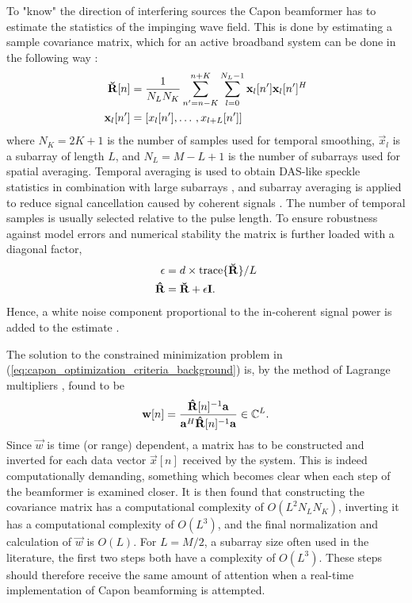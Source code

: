 To "know" the direction of interfering sources the Capon beamformer has to estimate the statistics of the impinging wave field. This is done by estimating a sample covariance matrix, which for an active broadband system can be done in the following way \cite{Synnevag2009}:
\begin{align}
\mathbf{\breve{R}}[n] &= \frac{1}{N_LN_K}\sum_{n'=n-K}^{n+K} \sum_{l=0}^{N_L-1} \mathbf{x}_l[n']\mathbf{x}_l[n']^H\\
\mathbf{x}_l[n'] &= [x_l[n'], \dotso, x_{l+L}[n']]
\end{align}
where $N_K = 2K + 1$  is the number of samples used for temporal smoothing, $\vec{x}_l$ is a subarray of length $L$, and $N_L = M-L+1$ is the number of subarrays used for spatial averaging.  Temporal averaging is used to obtain DAS-like speckle statistics in combination with large subarrays \cite{Synnevag2007a}, and subarray averaging is applied to reduce signal cancellation caused by coherent signals \cite{Reddy1987}. The number of temporal samples is usually selected relative to the pulse length. To ensure robustness against model errors and numerical stability the matrix is further loaded with a diagonal factor, 
\begin{align}
\epsilon &= d\times\text{trace}\{\mathbf{\breve{R}}\}/L\\
\mathbf{\hat{R}} &= \mathbf{\breve{R}} + \epsilon\mathbf{I}.
\end{align} 
Hence, a white noise component proportional to the in-coherent signal power is added to the estimate \cite{Featherstone1997b}.

The solution to the constrained minimization problem in (\ref{eq:capon_optimization_criteria_background}) is, by the method of Lagrange multipliers \cite{VanTrees2003}, found to be
\begin{align}\label{eq:capon_weights}
\mathbf{w}[n] = \frac{\mathbf{\hat{R}}[n]^{-1}\mathbf{a}}{\mathbf{a}^H\mathbf{\hat{R}}[n]^{-1}\mathbf{a}} \in \mathbb{C}^L.
\end{align}
Since $\vec{w}$ is time (or range) dependent, a matrix has to be constructed and inverted for each data vector $\vec{x}[n]$ received by the system. This is indeed computationally demanding, something which becomes clear when each step of the beamformer is examined closer. It is then found that constructing the covariance matrix has a computational complexity of $O(L^2N_LN_K)$, inverting it has a computational complexity of $O(L^3)$, and the final normalization and calculation of $\vec{w}$ is $O(L)$. For $L=M/2$, a subarray size often used in the literature, the first two steps both have a complexity of $O(L^3)$. These steps should therefore receive the same amount of attention when a real-time implementation of Capon beamforming is attempted.

